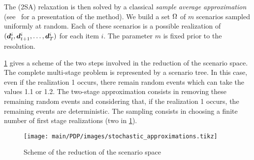 The (2SA) relaxation is then solved by a classical {\em sample average approximation} (see~\citet{Kleywegt2002} for a presentation of the method).
We build a set $\Omega$ of $m$ scenarios sampled uniformly at random.
Each of these scenarios is a possible realization of $(\va\demand_t^i,\va\demand_{t+1}^i,\ldots,\va\demand_{\horizon}^i)$ for each item $i$.
The parameter $m$ is fixed prior to the resolution.


\cref{fig:scenario-space-reduction} gives a scheme of the two steps involved in the reduction of the scenario space.
The complete multi-stage problem is represented by a scenario tree.
In this case, even if the realization 1 occurs, there remain random events which can take the values 1.1 or 1.2.
The two-stage approximation consists in removing these remaining random events and considering that, if the realization 1 occurs, the remaining events are deterministic.
The sampling consists in choosing a finite number of first stage realizations (two in \cref{fig:scenario-space-reduction}).
\begin{figure}[h]
  \centering
  \texttt{[image: main/PDP/images/stochastic\_approximations.tikz]}
  \caption{Scheme of the reduction of the scenario space}
  \label{fig:scenario-space-reduction}
\end{figure}


